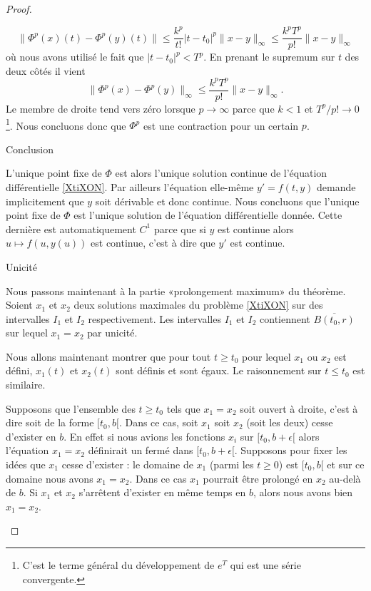 \begin{proof}
\begin{subproof}
    \begin{equation}
         \| \Phi^p(x)(t)-\Phi^p(y)(t) \|\leq \frac{ k^p }{ t! }| t-t_0 |^p\| x-y \|_{\infty}     \leq \frac{ k^pT^p }{ p! }\| x-y \|_{\infty}
    \end{equation}
    où nous avons utilisé le fait que \( | t-t_0 |^p<T^p\). En prenant le supremum sur \( t\) des deux côtés il vient
    \begin{equation}
        \| \Phi^p(x)-\Phi^p(y) \|_{\infty}\leq\frac{ k^pT^p }{ p! }\| x-y \|_{\infty}.
    \end{equation}
    Le membre de droite tend vers zéro lorsque \( p\to\infty\) parce que \( k<1\) et \( T^p/p!\to 0\)\footnote{C'est le terme général du développement de \(  e^{T}\) qui est une série convergente.}. Nous concluons donc que \( \Phi^p\) est une contraction pour un certain \( p\).

\item[Conclusion]

    L'unique point fixe de \( \Phi\) est alors l'unique solution continue de l'équation différentielle \eqref{XtiXON}. Par ailleurs l'équation elle-même \( y'=f(t,y)\) demande implicitement que \( y\) soit dérivable et donc continue. Nous concluons que l'unique point fixe de \( \Phi\) est l'unique solution de l'équation différentielle donnée. Cette dernière est automatiquement \( C^1\) parce que si \( y\) est continue alors \( u\mapsto f(u,y(u))\) est continue, c'est à dire que \( y'\) est continue.

\item[Unicité]

    Nous passons maintenant à la partie «prolongement maximum» du théorème. Soient \( x_1\) et \( x_2\) deux solutions maximales du problème \eqref{XtiXON} sur des intervalles \( I_1\) et \( I_2\) respectivement. Les intervalles \( I_1\) et \( I_2\) contiennent \( \overline{ B(t_0,r) }\) sur lequel \( x_1=x_2\) par unicité.
    
    
    Nous allons maintenant montrer que pour tout \( t\geq t_0\) pour lequel \( x_1\) ou \( x_2\) est défini, \( x_1(t)\) et \( x_2(t)\) sont définis et sont égaux. Le raisonnement sur \( t\leq t_0\) est similaire.
    
    Supposons que l'ensemble des \( t\geq t_0\) tels que \( x_1=x_2\) soit ouvert à droite, c'est à dire soit de la forme \( \mathopen[ t_0 ,b [\). Dans ce cas, soit \( x_1\) soit \( x_2\) (soit les deux) cesse d'exister en \( b\). En effet si nous avions les fonctions \( x_i\) sur \(\mathopen[ t_0 , b+\epsilon [\) alors l'équation \( x_1=x_2\) définirait un fermé dans \( \mathopen[ t_0 , b+\epsilon [\). Supposons pour fixer les idées que \( x_1\) cesse d'exister : le domaine de \( x_1\) (parmi les \( t\geq 0\)) est \( \mathopen[ t_0 , b [\) et sur ce domaine nous avons \( x_1=x_2\). Dans ce cas \( x_1\) pourrait être prolongé en \( x_2\) au-delà de \( b\). Si \( x_1\) et \( x_2\) s'arrêtent d'exister en même temps en \( b\), alors nous avons bien \( x_1=x_2\).


\end{subproof}
\end{proof}
